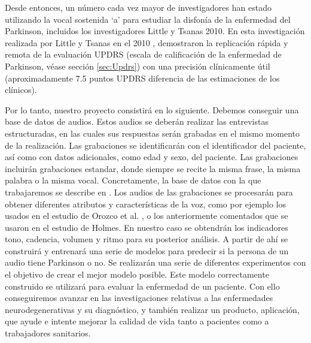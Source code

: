 Desde entonces, un número cada vez mayor de investigadores han estado utilizando la vocal sostenida `a' para estudiar la disfonía de la enfermedad del Parkinson, incluidos los investigadores Little y Tsanas 2010. En esta investigación realizada por Little y Tsanas en el 2010 \cite{MxLtAccurate}, demostraron la replicación rápida y remota de la evaluación UPDRS (escala de calificación de la enfermedad de Parkinson, véase sección \ref{sec:Updrs}) con una precisión clínicamente útil (aproximadamente 7.5 puntos UPDRS diferencia de las estimaciones de los clínicos).

Por lo tanto, nuestro proyecto consistirá en lo siguiente. Debemos conseguir una base de datos de audios. Estos audios se deberán realizar las entrevistas estructuradas, en las cuales sus respuestas serán grabadas en el mismo momento de la realización. Las grabaciones se identificarán con el identificador del paciente, así como con datos adicionales, como edad y sexo, del paciente. Las grabaciones incluirán grabaciones estandar, donde siempre se recite la misma frase, la misma palabra o la misma vocal. Concretamente, la base de datos con la que trabajaremos se describe en  \cite{OrzCorpus}. Los audios de las grabaciones se procesarán para obtener diferentes atributos y características de la voz, como por ejemplo los usados en el estudio de Orozco et al. \cite{Orz2016}, o los anteriormente comentados que se usaron en el estudio de Holmes. En nuestro caso se obtendrán los indicadores tono, cadencia, volumen y ritmo para su posterior análisis. A partir de ahí se construirá y entrenará una serie de modelos para predecir si la persona de un audio tiene Parkinson o no. Se realizarán una serie de diferentes experimentos con el objetivo de crear el mejor modelo posible. Este modelo correctamente construido se utilizará para evaluar la enfermedad de un paciente. Con ello conseguiremos avanzar en las investigaciones relativas a las enfermedades neurodegenerativas y su diagnóstico, y también realizar un producto, aplicación, que ayude e intente mejorar la calidad de vida tanto a pacientes como a trabajadores sanitarios.




